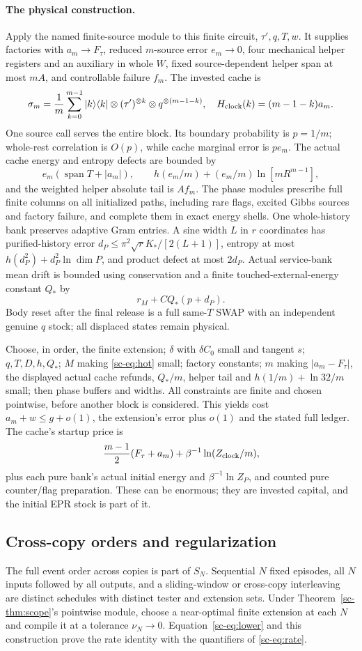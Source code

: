 \documentclass[11pt]{article}
\theoremstyle{definition}
\theoremstyle{remark}
\begin{document}
\paragraph{The physical construction.}
Apply the named finite-source module to this finite circuit, $\tau',q,T,w$. It supplies factories with $a_m\to F_\tau$, reduced $m$-source error $e_m\to0$, four mechanical helper registers and an auxiliary in whole $W$, fixed source-dependent helper span at most $mA$, and controllable failure $f_m$. The invested cache is
\[
\sigma_m=\frac1m\sum_{k=0}^{m-1}|k\rangle\langle k|\otimes(\tau')^{\otimes k}\otimes q^{\otimes(m-1-k)},
\quad H_{\rm clock}(k)=(m-1-k)a_m.
\]
One source call serves the entire block. Its boundary probability is $p=1/m$; whole-rest correlation is $O(p)$, while cache marginal error is $p e_m$. The actual cache energy and entropy defects are bounded by
\[
e_m(\operatorname{span}T+|a_m|),\qquad
h(e_m/m)+(e_m/m)\ln[mR^{m-1}],
\]
and the weighted helper absolute tail is $Af_m$. The phase modules prescribe full finite columns on all initialized paths, including rare flags, excited Gibbs sources and factory failure, and complete them in exact energy shells. One whole-history bank preserves adaptive Gram entries. A sine width $L$ in $r$ coordinates has purified-history error $d_P\le\pi^2\sqrt r K_*/[2(L+1)]$, entropy at most $h(d_P^2)+d_P^2\ln\dim P$, and product defect at most $2d_P$. Actual service-bank mean drift is bounded using conservation and a finite touched-external-energy constant $Q_*$ by
\[
r_M+C Q_*(p+d_P).
\] Body reset after the final release is a full same-$T$ SWAP with an independent genuine $q$ stock; all displaced states remain physical.

Choose, in order, the finite extension; $\delta$ with $\delta C_0$ small and tangent $s$; $q,T,D,h,Q_*$; $M$ making \eqref{sc-eq:hot} small; factory constants; $m$ making $|a_m-F_\tau|$, the displayed actual cache refunds, $Q_*/m$, helper tail and $h(1/m)+\ln32/m$ small; then phase buffers and widths. All constraints are finite and chosen pointwise, before another block is considered. This yields cost $a_m+w\le g+o(1)$, the extension's error plus $o(1)$ and the stated full ledger. The cache's startup price is
\[
\frac{m-1}{2}(F_\tau+a_m)+\beta^{-1}\ln(Z_{\rm clock}/m),
\]
plus each pure bank's actual initial energy and $\beta^{-1}\ln Z_P$, and counted pure counter/flag preparation. These can be enormous; they are invested capital, and the initial EPR stock is part of it.

\subsection{Cross-copy orders and regularization}
The full event order across copies is part of $S_N$. Sequential $N$ fixed episodes, all $N$ inputs followed by all outputs, and a sliding-window or cross-copy interleaving are distinct schedules with distinct tester and extension sets. Under Theorem~\ref{sc-thm:scope}'s pointwise module, choose a near-optimal finite extension at each $N$ and compile it at a tolerance $\nu_N\to0$. Equation~\eqref{sc-eq:lower} and this construction prove the rate identity with the quantifiers of \eqref{sc-eq:rate}.
\end{document}
